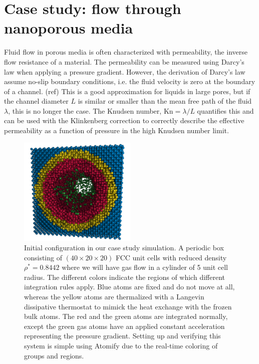 \documentclass[aps,pre,twocolumn,letterpaper,floatfix,nofootinbib]{revtex4}
\begin{document}
\section{\label{sec:casestudy}Case study: flow through nanoporous media}
Fluid flow in porous media is often characterized with permeability, the inverse flow resistance of a material.
The permeability can be measured using Darcy's law when applying a pressure gradient.
However, the derivation of Darcy's law assume no-slip boundary conditions, i.e. the fluid velocity is zero at the boundary of a channel. (ref)
This is a good approximation for liquids in large pores, but if the channel diameter $L$ is similar or smaller than the mean free path of the fluid $\lambda$, this is no longer the case.
The Knudsen number, $\text{Kn} = \lambda / L$ quantifies this and can be used with the Klinkenberg correction to correctly describe the effective permeability as a function of pressure in the high Knudsen number limit.

\begin{figure}
	\centering
	\includegraphics[width=0.5\textwidth]{lj_flow/configuration.png}
	\caption{
		Initial configuration in our case study simulation.
		A periodic box consisting of $(40\times20\times20)$ FCC unit cells with reduced density $\rho^* = 0.8442$ where we will have gas flow in a cylinder of 5 unit cell radius.
		The different colors indicate the regions of which different integration rules apply.
		\textcolor{atomify-blue}{Blue} atoms are fixed and do not move at all,
		whereas the \textcolor{atomify-yellow}{yellow} atoms are thermalized with a Langevin\citep{schneider1978molecular} dissipative thermostat to mimick the heat exchange with the frozen bulk atoms.
		The \textcolor{atomify-red}{red} and the \textcolor{atomify-green}{green} atoms are integrated normally, except the \textcolor{atomify-green}{green} gas atoms have an applied constant acceleration representing the pressure gradient.
		Setting up and verifying this system is simple using Atomify due to the real-time coloring of groups and regions.
    }
	\label{fig:cylinder_simulation}
\end{figure}
\end{document}
